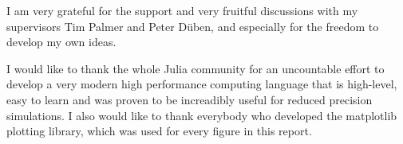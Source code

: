 \begin{acknowledgements}

I am very grateful for the support and very fruitful discussions with my supervisors Tim Palmer and Peter D\"{u}ben, and especially for the freedom to develop my own ideas.

 I would like to thank the whole Julia community for an uncountable effort to develop a very modern high performance computing language that is high-level, easy to learn and was proven to be increadibly useful for reduced precision simulations. I also would like to thank everybody who developed the matplotlib plotting library, which was used for every figure in this report.
 
\end{acknowledgements}

